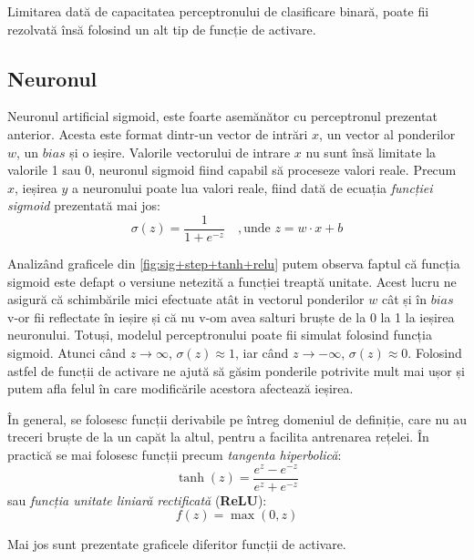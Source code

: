 Limitarea dată de capacitatea perceptronului de clasificare binară, poate fii rezolvată însă folosind un alt tip de funcție de activare. 

\subsection{Neuronul}
Neuronul artificial sigmoid, este foarte asemănător cu perceptronul prezentat anterior. Acesta este format dintr-un vector de intrări $x$, un vector al ponderilor $w$, un $bias$ și o ieșire. Valorile vectorului de intrare $x$ nu sunt însă limitate la valorile 1 sau 0, neuronul sigmoid fiind capabil să proceseze valori reale. Precum $x$, ieșirea $y$ a neuronului poate lua valori reale, fiind dată de ecuația \textit{funcției sigmoid} prezentată mai jos:
\begin{equation}
\sigma(z) = \frac{1}{1+e^{-z}} \quad,\text{unde }z= w\cdot x + b
\end{equation}

Analizând graficele din \autoref{fig:sig+step+tanh+relu} putem observa faptul că funcția sigmoid este defapt o versiune netezită a funcției treaptă unitate. Acest lucru ne asigură că schimbările mici efectuate atât in vectorul ponderilor $w$ cât și în $bias$ v-or fii reflectate în ieșire și că nu v-om avea salturi bruște de la 0 la 1 la ieșirea neuronului.
Totuși, modelul perceptronului poate fii simulat folosind funcția sigmoid. Atunci când $z\rightarrow\infty$, $\sigma(z)\approx 1$, iar când $z\rightarrow-\infty$, $\sigma(z)\approx 0$. Folosind astfel de funcții de activare ne ajută să găsim ponderile potrivite mult mai ușor și putem afla felul în care modificările acestora afectează ieșirea.

În general, se folosesc funcții derivabile pe întreg domeniul de definiție, care nu au treceri bruște de la un capăt la altul, pentru a facilita antrenarea rețelei. În practică se mai folosesc funcții precum \textit{tangenta hiperbolică}:
\begin{equation}
\tanh(z)=\frac{e^z - e^{-z}}{e^z + e^{-z}}
\end{equation}
sau \textit{funcția unitate liniară rectificată} (\textbf{ReLU}):
\begin{equation}
f(z)=\max(0,z)
\end{equation}

Mai jos sunt prezentate graficele diferitor funcții de activare.

